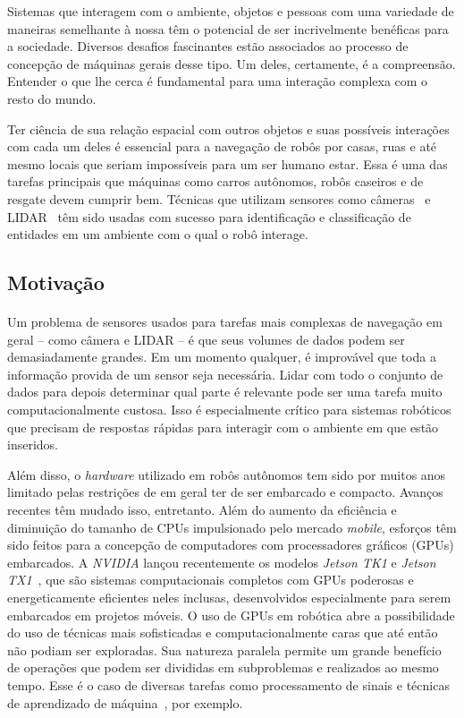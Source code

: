 \documentclass[11pt]{article}
\newcommand{\tit}[1]{\textit{#1}}
\begin{document}
Sistemas que interagem com o ambiente, objetos e pessoas 
com uma variedade de maneiras semelhante à nossa têm o potencial de ser 
incrivelmente benéficas para a sociedade. 
Diversos desafios fascinantes estão associados ao processo de concepção de 
máquinas gerais desse tipo. 
Um deles, certamente, é a compreensão. 
Entender o que lhe cerca é fundamental para uma interação complexa com o resto
do mundo. 

Ter ciência de sua relação espacial com outros objetos e 
suas possíveis interações com cada um deles é essencial para a navegação 
de robôs por casas, ruas e até mesmo locais que seriam impossíveis 
para um ser humano estar. 
Essa é uma das tarefas principais que máquinas como carros autônomos, 
robôs caseiros e de resgate devem cumprir bem.
Técnicas que utilizam sensores como câmeras~\cite{vision} e LIDAR~\cite{car} 
têm sido usadas com sucesso para identificação e classificação de entidades 
em um ambiente com o qual o robô interage. 

\subsection{Motivação}
\paragraph{}
Um problema de sensores usados para tarefas mais complexas de navegação
em geral -- como câmera e LIDAR  --
é que seus volumes de dados podem ser demasiadamente grandes. 
Em um momento qualquer, é improvável que 
toda a informação provida de um sensor seja necessária. 
Lidar com todo o conjunto de dados para depois determinar qual parte é 
relevante pode ser uma tarefa muito computacionalmente custosa. 
Isso é especialmente crítico para sistemas robóticos que precisam de respostas
rápidas para interagir com o ambiente em que estão inseridos. 

Além disso, o \tit{hardware} utilizado em robôs autônomos tem sido por muitos 
anos limitado pelas restrições de em geral ter de ser embarcado e compacto.
Avanços recentes têm mudado isso, entretanto. 
Além do aumento da eficiência e diminuição do tamanho de CPUs impulsionado
pelo mercado \tit{mobile}, esforços têm sido feitos para a concepção de 
computadores com processadores gráficos (GPUs) embarcados. 
A \tit{NVIDIA} lançou recentemente os modelos 
\tit{Jetson TK1} e \tit{Jetson TX1}~\cite{jetson}, que são sistemas 
computacionais completos com GPUs poderosas e energeticamente eficientes neles 
inclusas, desenvolvidos especialmente para serem embarcados em projetos móveis.
O uso de GPUs em robótica abre a possibilidade do uso de técnicas mais 
sofisticadas e computacionalmente caras que até então não podiam ser exploradas.
Sua natureza paralela permite um grande benefício de operações que podem ser
divididas em subproblemas e realizados ao mesmo tempo. 
Esse é o caso de diversas tarefas como processamento de sinais e técnicas 
de aprendizado de máquina~\cite{gpu}, por exemplo. 
\end{document}
